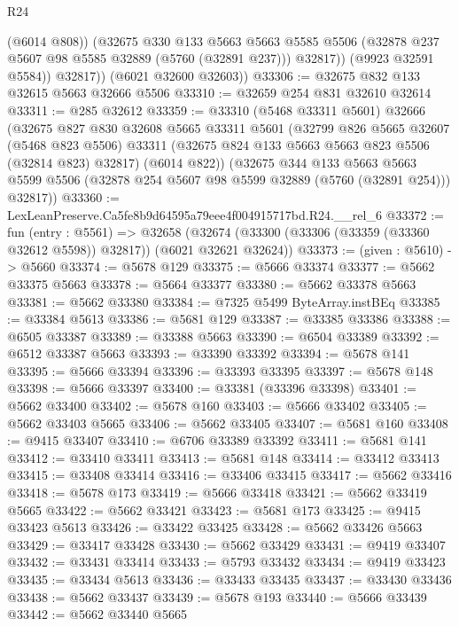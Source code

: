 \begin{lexlean}{R24}
\begin{coremodule}
                (@6014 @808))
              (@32675
                @330
                @133
                @5663
                @5663
                @5585
                @5506
                (@32878 @237 @5607 @98 @5585 @32889 (@5760 (@32891 @237)))
                @32817))
            (@9923 @32591 @5584))
          @32817))
      (@6021 @32600 @32603))
@33306 := @32675 @832 @133 @32615 @5663 @32666 @5506
@33310 := @32659 @254 @831 @32610 @32614
@33311 := @285 @32612
@33359 := @33310
    (@5468 @33311 @5601)
    @32666
    (@32675
      @827
      @830
      @32608
      @5665
      @33311
      @5601
      (@32799
        @826
        @5665
        @32607
        (@5468 @823 @5506)
        @33311
        (@32675 @824 @133 @5663 @5663 @823 @5506 (@32814 @823) @32817)
        (@6014 @822))
      (@32675
        @344
        @133
        @5663
        @5663
        @5599
        @5506
        (@32878 @254 @5607 @98 @5599 @32889 (@5760 (@32891 @254)))
        @32817))
@33360 := LexLeanPreserve.Ca5fe8b9d64595a79eee4f004915717bd.R24.__rel_6
@33372 := fun (entry : @5561) =>
  @32658 (@32674 (@33300 (@33306 (@33359 (@33360 @32612 @5598)) @32817)) (@6021 @32621 @32624))
@33373 := (given : @5610) -> @5660
@33374 := @5678 @129
@33375 := @5666 @33374
@33377 := @5662 @33375 @5663
@33378 := @5664 @33377
@33380 := @5662 @33378 @5663
@33381 := @5662 @33380
@33384 := @7325 @5499 ByteArray.instBEq
@33385 := @33384 @5613
@33386 := @5681 @129
@33387 := @33385 @33386
@33388 := @6505 @33387
@33389 := @33388 @5663
@33390 := @6504 @33389
@33392 := @6512 @33387 @5663
@33393 := @33390 @33392
@33394 := @5678 @141
@33395 := @5666 @33394
@33396 := @33393 @33395
@33397 := @5678 @148
@33398 := @5666 @33397
@33400 := @33381 (@33396 @33398)
@33401 := @5662 @33400
@33402 := @5678 @160
@33403 := @5666 @33402
@33405 := @5662 @33403 @5665
@33406 := @5662 @33405
@33407 := @5681 @160
@33408 := @9415 @33407
@33410 := @6706 @33389 @33392
@33411 := @5681 @141
@33412 := @33410 @33411
@33413 := @5681 @148
@33414 := @33412 @33413
@33415 := @33408 @33414
@33416 := @33406 @33415
@33417 := @5662 @33416
@33418 := @5678 @173
@33419 := @5666 @33418
@33421 := @5662 @33419 @5665
@33422 := @5662 @33421
@33423 := @5681 @173
@33425 := @9415 @33423 @5613
@33426 := @33422 @33425
@33428 := @5662 @33426 @5663
@33429 := @33417 @33428
@33430 := @5662 @33429
@33431 := @9419 @33407
@33432 := @33431 @33414
@33433 := @5793 @33432
@33434 := @9419 @33423
@33435 := @33434 @5613
@33436 := @33433 @33435
@33437 := @33430 @33436
@33438 := @5662 @33437
@33439 := @5678 @193
@33440 := @5666 @33439
@33442 := @5662 @33440 @5665

\end{coremodule}
\end{lexlean}
